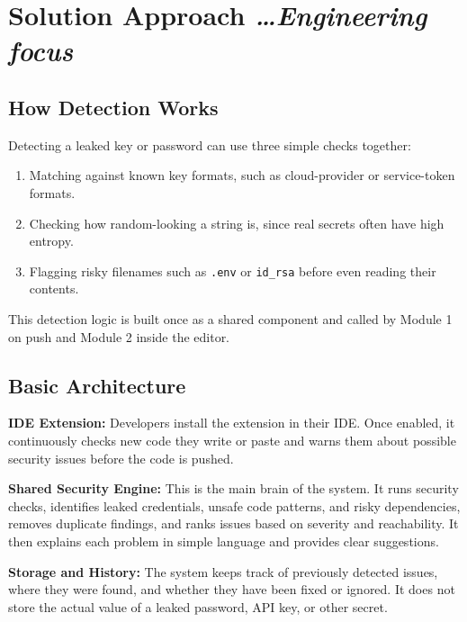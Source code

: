 \documentclass[11pt,a4paper]{article}
\newcommand{\BvrHint}[1]{%
  {\normalfont\normalsize\itshape\hfill #1}}
\begin{document}
\section{Solution Approach
  \BvrHint{\ldots Engineering focus}}

\subsection{How Detection Works}

Detecting a leaked key or password can use three simple checks together:

\begin{enumerate}[leftmargin=0.7cm]

    \item Matching against known key formats, such as cloud-provider or service-token formats.

    \item Checking how random-looking a string is, since real secrets often have high entropy.

    \item Flagging risky filenames such as \texttt{.env} or \texttt{id\_rsa} before even reading their contents.

\end{enumerate}

This detection logic is built once as a shared component and called by Module 1 on push and Module 2 inside the editor.

\subsection{Basic Architecture}

\textbf{IDE Extension:} Developers install the extension in their IDE. Once enabled, it continuously checks new code they write or paste and warns them about possible security issues before the code is pushed.

\textbf{Shared Security Engine:} This is the main brain of the system. It runs security checks, identifies leaked credentials, unsafe code patterns, and risky dependencies, removes duplicate findings, and ranks issues based on severity and reachability. It then explains each problem in simple language and provides clear suggestions.

\textbf{Storage and History:} The system keeps track of previously detected issues, where they were found, and whether they have been fixed or ignored. It does not store the actual value of a leaked password, API key, or other secret.
\end{document}
